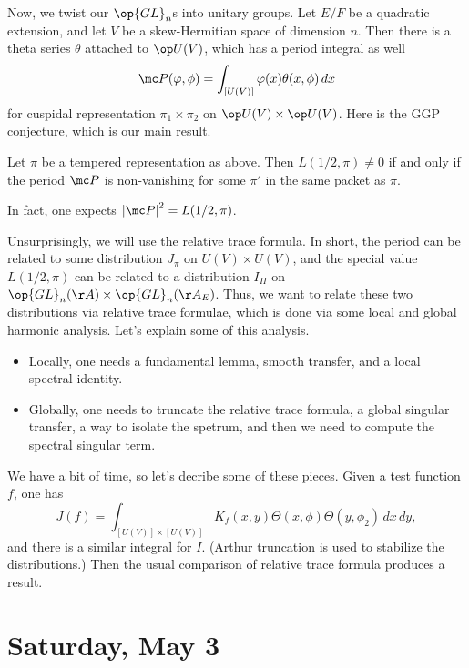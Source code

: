 \documentclass{article}
\begin{document}
Now, we twist our $\op{GL}_n$s into unitary groups. Let $E/F$ be a quadratic extension, and let $V$ be a skew-Hermitian space of dimension $n$. Then there is a theta series $\theta$ attached to $\op U(V)$, which has a period integral as well
\[\mc P(\varphi,\phi)=\int_{[U(V)]}\varphi(x)\theta(x,\phi)\,dx\]
for cuspidal representation $\pi_1\times\pi_2$ on $\op U(V)\times\op U(V)$. Here is the GGP conjecture, which is our main result.
\begin{theorem}
	Let $\pi$ be a tempered representation as above. Then $L(1/2,\pi)\ne0$ if and only if the period $\mc P$ is non-vanishing for some $\pi'$ in the same packet as $\pi$.
\end{theorem}
\begin{remark}
	In fact, one expects $\left|\mc P\right|^2=L(1/2,\pi)$.
\end{remark}
Unsurprisingly, we will use the relative trace formula. In short, the period can be related to some distribution $J_\pi$ on $U(V)\times U(V)$, and the special value $L(1/2,\pi)$ can be related to a distribution $I_\Pi$ on $\op{GL}_n(\AA)\times\op{GL}_n(\AA_E)$. Thus, we want to relate these two distributions via relative trace formulae, which is done via some local and global harmonic analysis. Let's explain some of this analysis.
\begin{itemize}
	\item Locally, one needs a fundamental lemma, smooth transfer, and a local spectral identity.
	\item Globally, one needs to truncate the relative trace formula, a global singular transfer, a way to isolate the spetrum, and then we need to compute the spectral singular term.
\end{itemize}
We have a bit of time, so let's decribe some of these pieces. Given a test function $f$, one has
\[J(f)=\int_{[U(V)]\times[U(V)]}K_f(x,y)\Theta(x,\phi)\Theta(y,\phi_2)\,dx\,dy,\]
and there is a similar integral for $I$. (Arthur truncation is used to stabilize the distributions.) Then the usual comparison of relative trace formula produces a result.

\section{Saturday, May 3}
\end{document}

